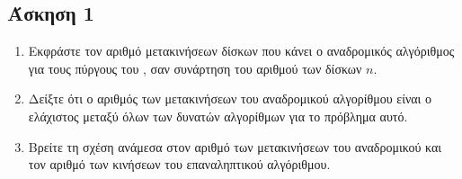 \documentclass{assignment}
\begin{document}
\maketitle

\newpage\subsection*{Άσκηση 1}
\begin{enumerate}
\item
Εκφράστε τον αριθμό μετακινήσεων δίσκων που κάνει ο αναδρομικός αλγόριθμος 
για τους πύργους του , σαν συνάρτηση του αριθμού των δίσκων $n$.
\item
Δείξτε ότι ο αριθμός των μετακινήσεων του αναδρομικού αλγορίθμου είναι
ο ελάχιστος μεταξύ όλων των δυνατών αλγορίθμων για το πρόβλημα αυτό.
\item
Βρείτε τη σχέση ανάμεσα στον αριθμό των μετακινήσεων του αναδρομικού και
τον αριθμό των κινήσεων του επαναληπτικού αλγόριθμου.
\end{enumerate}
\end{document}
